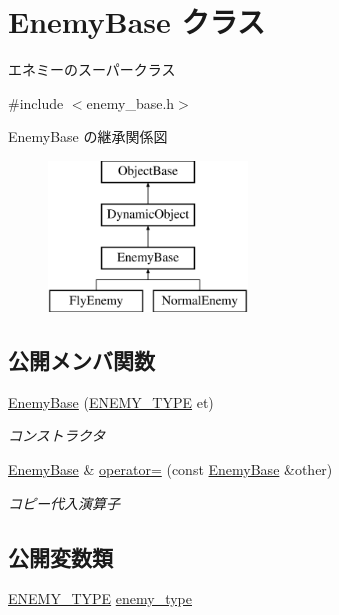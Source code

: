 \hypertarget{class_enemy_base}{}\section{Enemy\+Base クラス}
\label{class_enemy_base}


エネミーのスーパークラス  




{\ttfamily \#include $<$enemy\+\_\+base.\+h$>$}

Enemy\+Base の継承関係図\begin{figure}[H]
\begin{center}
\leavevmode
\includegraphics[height=4.000000cm]{class_enemy_base}
\end{center}
\end{figure}
\subsection*{公開メンバ関数}
\begin{DoxyCompactItemize}
\item 
\mbox{\hyperlink{class_enemy_base_abe56e3aa221224c1196fd65f897d5f19}{Enemy\+Base}} (\mbox{\hyperlink{enemy__base_8h_aef73e23ea1cdc9dda520bbb81af707db}{E\+N\+E\+M\+Y\+\_\+\+T\+Y\+PE}} et)
\begin{DoxyCompactList}\small\item\em コンストラクタ \end{DoxyCompactList}\item 
\mbox{\hyperlink{class_enemy_base}{Enemy\+Base}} \& \mbox{\hyperlink{class_enemy_base_ab733c603aedea1306fe42755c784a9db}{operator=}} (const \mbox{\hyperlink{class_enemy_base}{Enemy\+Base}} \&other)
\begin{DoxyCompactList}\small\item\em コピー代入演算子 \end{DoxyCompactList}\end{DoxyCompactItemize}
\subsection*{公開変数類}
\begin{DoxyCompactItemize}
\item 
\mbox{\hyperlink{enemy__base_8h_aef73e23ea1cdc9dda520bbb81af707db}{E\+N\+E\+M\+Y\+\_\+\+T\+Y\+PE}} \mbox{\hyperlink{class_enemy_base_a34ad22e6b0d06b8d63c207c843383eba}{enemy\+\_\+type}}
\end{DoxyCompactItemize}
